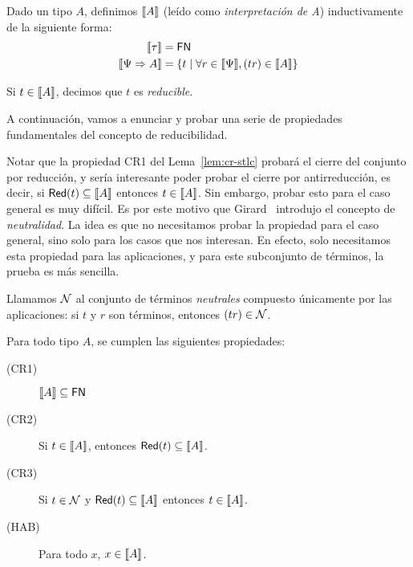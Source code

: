 \begin{definition}
  Dado un tipo \( A \), definimos \( \llbracket A\rrbracket \) (leído como \textit{interpretación de A}) inductivamente de la siguiente forma:
  \begin{equation*}
    \begin{split}
      \llbracket\tau\rrbracket & = \mathsf{FN} \\
      \llbracket\Psi \Rightarrow A\rrbracket & = \{ t \mid \forall r \in \llbracket\Psi\rrbracket, (t r) \in \llbracket A\rrbracket \}
    \end{split}
  \end{equation*}

  Si \( t \in \llbracket A\rrbracket \), decimos que \( t \) es \textit{reducible}.
\end{definition}

A continuación, vamos a enunciar y probar una serie de propiedades fundamentales del concepto de reducibilidad.

Notar que la propiedad CR1 del Lema~\ref{lem:cr-stlc} probará el cierre del conjunto por reducción, y sería interesante poder probar el cierre por antirreducción, es decir, si \( \mathsf{Red} (t) \subseteq \llbracket A\rrbracket \) entonces \( t \in \llbracket A\rrbracket \). Sin embargo, probar esto para el caso general es muy difícil. Es por este motivo que Girard~\cite{girard-thesis} introdujo el concepto de \textit{neutralidad}. La idea es que no necesitamos probar la propiedad para el caso general, sino solo para los casos que nos interesan. En efecto, solo necesitamos esta propiedad para las aplicaciones, y para este subconjunto de términos, la prueba es más sencilla.

\begin{definition}
  Llamamos \( \mathcal{N} \) al conjunto de términos \textit{neutrales} compuesto únicamente por las aplicaciones: si \( t \) y \( r \) son términos, entonces \( (t r) \in \mathcal{N} \).
\end{definition}

\begin{lemma}\label{lem:cr-stlc}
  Para todo tipo \( A \), se cumplen las siguientes propiedades:
  \begin{description}
    \item[(CR1)] \( \llbracket A\rrbracket \subseteq \mathsf{FN} \)
    \item[(CR2)] Si \( t \in \llbracket A\rrbracket \), entonces \( \mathsf{Red} (t) \subseteq \llbracket A\rrbracket \).
    \item[(CR3)] Si \( t \in \mathcal{N} \) y \( \mathsf{Red} (t) \subseteq \llbracket A\rrbracket \) entonces \( t \in \llbracket A\rrbracket \).
    \item[(HAB)] Para todo \( x \), \( x \in \llbracket A\rrbracket \).
  \end{description}
\end{lemma}

